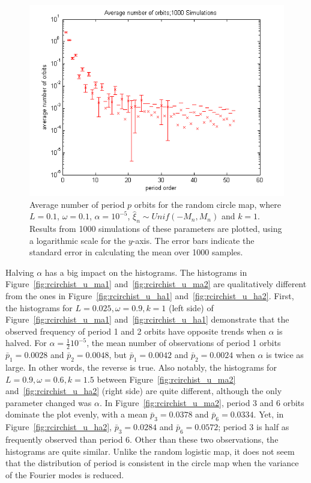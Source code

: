 \begin{figure}[H]\linespread{1}
\caption[Average number of period $p$ orbits for the random circle
map, $\alpha = 10^{-5}$]{Average number of period $p$ orbits for the random circle map,
  where $L=0.1$, $\omega =0.1$, $\alpha = 10^{-5}$, $\hat{\xi}_n\sim
  Unif(-M_n,M_n)$ and $k=1$. Results from 1000 simulations of these
  parameters are plotted, using a logarithmic scale for the
  $y$-axis. The error bars indicate the standard error in calculating the mean over 1000 samples.}\label{fig:avgcircorbs}
	\begin{center}
		\includegraphics[scale=0.65]{figs/rcirc_avg_num_1000_sim_logscale.png}
	\end{center}
\end{figure}

Halving $\alpha$ has a big impact on the histograms. The histograms in
Figure~\ref{fig:rcirchist_u_ma1} and~\ref{fig:rcirchist_u_ma2} are
qualitatively different from the ones in Figure~\ref{fig:rcirchist_u_ha1}
and~\ref{fig:rcirchist_u_ha2}. First, the histograms for $L=0.025,
\omega = 0.9, k = 1$ (left side)
of Figure~\ref{fig:rcirchist_u_ma1} and~\ref{fig:rcirchist_u_ha1} demonstrate that the observed frequency of
period 1 and 2 orbits have opposite trends when $\alpha$ is
halved. For $\alpha = \frac{1}{2}10^{-5}$, the mean number of
observations of period 1 orbits $\bar{p}_1=0.0028$ and
$\bar{p}_2=0.0048$, but $\bar{p}_1=0.0042$ and
$\bar{p}_2=0.0024$ when $\alpha$ is twice as large. In other words,
the reverse is true. Also notably, the histograms for $L=0.9, \omega = 0.6, k=1.5$ between Figure~\ref{fig:rcirchist_u_ma2}
and~\ref{fig:rcirchist_u_ha2} (right side) are quite different, although the only
parameter changed was $\alpha$. In Figure~\ref{fig:rcirchist_u_ma2},
period 3 and 6 orbits dominate the plot evenly, with a mean $\bar{p}_3=0.0378$ and $\bar{p}_6=0.0334$. Yet, in
Figure~\ref{fig:rcirchist_u_ha2}, $\bar{p}_3=0.0284$ and
$\bar{p}_6=0.0572$; period 3 is half as frequently observed than
period 6. Other than these two observations, the histograms are quite
similar. Unlike the random logistic map, it does not seem that the
distribution of period is consistent in the circle map when the
variance of the Fourier modes is reduced.  

